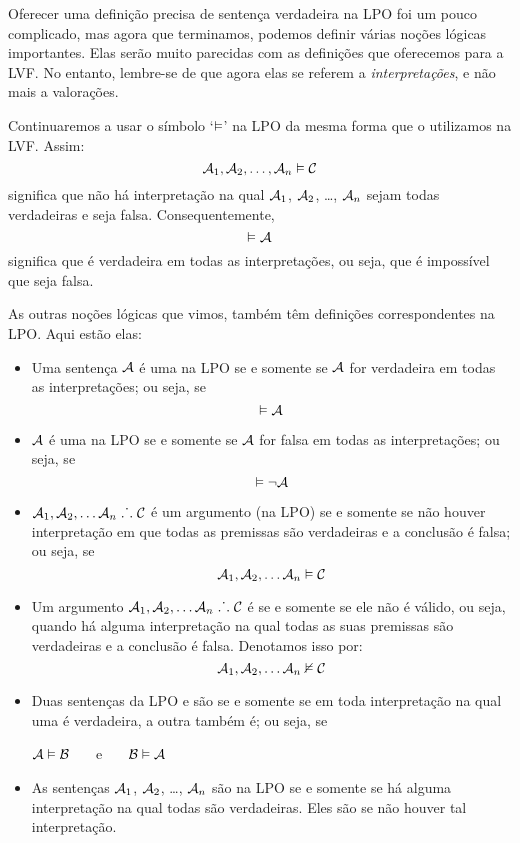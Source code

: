 Oferecer uma definição precisa de sentença verdadeira na LPO foi um pouco complicado, mas agora que terminamos, podemos definir várias noções lógicas importantes.
Elas serão muito parecidas com as definições que oferecemos para a LVF.
No entanto, lembre-se de que agora elas se referem a \emph{interpretações}, e não mais a valorações.

Continuaremos a usar o símbolo `$\vDash$' na LPO da mesma forma que o utilizamos na LVF.
Assim:
	$$\mathcal{A}_1, \mathcal{A}_2, \ldots, \mathcal{A}_n \vDash\mathcal{C}$$
significa que não há interpretação na qual $\mathcal{A}_1$, $\mathcal{A}_2$, \dots, $\mathcal{A}_n$ sejam todas verdadeiras e  seja falsa. Consequentemente,
	$$\vDash\mathcal{A}$$
significa que  é verdadeira em todas as interpretações, ou seja, que é impossível que  seja falsa.

As outras noções lógicas que vimos, também têm definições correspondentes na LPO.
Aqui estão elas:

\begin{itemize}
\item Uma sentença  $\mathcal{A}$ é uma  na LPO se e somente se $\mathcal{A}$ for verdadeira em todas as interpretações; ou seja, se
$$\vDash\mathcal{A}$$
\item $\mathcal{A}$ é uma  na LPO se e somente se $\mathcal{A}$ for falsa em todas as interpretações; ou seja, se
$$\vDash\neg\mathcal{A}$$
\item $\mathcal{A}_1, \mathcal{A}_2, \ldots \mathcal{A}_n \mathrel{\ldotp\dot{}\,\ldotp} \mathcal{C}$ é um argumento  (na LPO) se e somente se não houver interpretação em que todas as premissas são verdadeiras e a conclusão é falsa; ou seja, se
$$\mathcal{A}_1,\mathcal{A}_2,\ldots \mathcal{A}_n \vDash\mathcal{C}$$

\item Um argumento $\mathcal{A}_1, \mathcal{A}_2, \ldots \mathcal{A}_n \mathrel{\ldotp\dot{}\,\ldotp} \mathcal{C}$ é  se e somente se ele não é válido, ou seja, quando há alguma interpretação na qual todas as suas premissas são verdadeiras e a conclusão é falsa.
Denotamos isso por:
$$\mathcal{A}_1,\mathcal{A}_2,\ldots \mathcal{A}_n \nvDash\mathcal{C}$$
 
\item Duas sentenças da LPO  e  são  se e somente se em toda interpretação na qual uma é verdadeira, a outra também é; ou seja, se
\begin{center}
	$\mathcal{A}\vDash\mathcal{B}$ \ \ \ e \ \ \ $\mathcal{B}\vDash\mathcal{A}$
\end{center}

\item As sentenças $\mathcal{A}_1$, $\mathcal{A}_2$, \dots, $\mathcal{A}_n$ são  na LPO se e somente se há alguma interpretação na qual todas são verdadeiras.
Eles são  se não houver tal interpretação.
\end{itemize}


